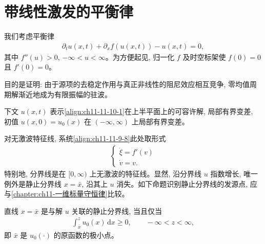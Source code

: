\documentclass[../../main.tex]{subfiles}
\begin{document}
\section{带线性激发的平衡律}\label{section:ch11-带线性激发的平衡律}

我们考虑平衡律
\begin{align}
\partial_t u(x,t)+\partial_x f(u(x,t))-u(x,t)=0,\label{align:ch11-11-10-1}
\end{align}
其中 $f''(u)>0$, $-\infty<u<\infty$。为方便起见, 归一化 $f$ 及时空标架使 $f(0)=0$ 且 $f'(0)=0$。

目的是证明: 由于源项的去稳定作用与真正非线性的阻尼效应相互竞争, 零均值周期解渐近地成为有限振幅的驻波。

下文 $u(x,t)$ 表示\eqref{align:ch11-11-10-1}在上半平面上的可容许解, 局部有界变差, 初值 $u(x,0)=u_0(x)$ 在 $(-\infty,\infty)$ 上局部有界变差。

对无激波特征线, 系统\eqref{align:ch11-11-9-8}此处取形式
\begin{align}
\begin{cases}
\dot{\xi}=f'(v)\\
\dot{v}=v.
\end{cases}\label{align:ch11-11-10-2}
\end{align}
特别地, 分界线是在 $[0,\infty)$ 上无激波的特征线。显然, 沿分界线 $u$ 指数增长, 唯一例外是静止分界线 $x=\bar x$, 沿其上 $u$ 消失。如下命题识别静止分界线的发源点, 应与\cref{chapter:ch11-一维标量守恒律}比较。


\begin{lemma}\label{lemma:ch11-11-10-1}
直线 $x=\bar x$ 是与解 $u$ 关联的静止分界线, 当且仅当
\begin{align}
\int_{\bar x}^{z}u_0(x)\,\mathrm{d}x\geqslant0,\qquad -\infty<z<\infty,\label{align:ch11-11-10-3}
\end{align}
即 $\bar x$ 是 $u_0(\cdot)$ 的原函数的极小点。
\end{lemma}
\end{document}

